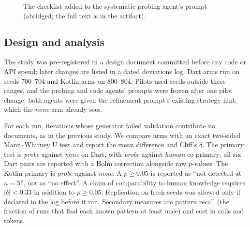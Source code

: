 \begin{figure}[t]
\centering
{}
\caption{The checklist added to the systematic probing agent's prompt
(abridged; the full text is in the artifact).}
\label{fig:checklist}
\end{figure}

\subsection{Design and analysis}

The study was pre-registered in a design document committed before any code
or API spend; later changes are listed in a dated deviations log. Dart arms
run on seeds 700--704 and Kotlin arms on 800--804. Pilots used seeds outside
these ranges, and the probing and code agents' prompts were frozen after one
pilot change: both agents were given the refinement prompt's existing
strategy hint, which the \emph{none} arm already sees.

For each run, iterations whose generator failed validation contribute no
documents, as in the previous study. We compare arms with an exact two-sided
Mann--Whitney U test and report the mean difference and Cliff's $\delta$.
The primary test is \emph{probe} against \emph{none} on Dart, with
\emph{probe} against \emph{human} co-primary; all six Dart pairs are reported
with a Holm correction alongside raw $p$-values. The Kotlin primary is
\emph{probe} against \emph{none}. A $p \geq 0.05$ is reported as ``not
detected at $n{=}5$'', not as ``no effect''. A claim of comparability to
human knowledge requires $|\delta| < 0.33$ in addition to $p \geq 0.05$.
Replication on fresh seeds was allowed only if declared in the log before
it ran. Secondary measures are pattern recall (the fraction of runs that
find each known pattern at least once) and cost in calls and tokens.
